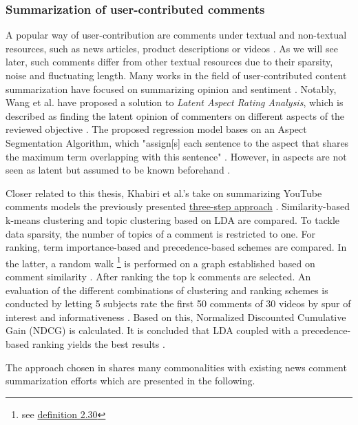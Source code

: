 \subsubsection{Summarization of user-contributed comments}
A popular way of user-contribution are comments under textual and non-textual resources, such as news articles, product descriptions or videos \cite{DBLP:conf/cikm/MaSYC12}. As we will see later, such comments differ from other textual resources due to their sparsity, noise and fluctuating length.
Many works in the field of user-contributed content summarization have focused on summarizing opinion and sentiment \cite{DBLP:conf/cikm/MaSYC12}.
Notably, Wang et al. \cite{Wang:2010:LAR:1835804.1835903} have proposed a solution to \textit{Latent Aspect Rating Analysis}, which is described as finding the latent opinion of commenters on different aspects of the reviewed objective \cite{Wang:2010:LAR:1835804.1835903}. The proposed regression model bases on an Aspect Segmentation Algorithm, which "assign[s] each sentence to the aspect that shares the maximum term overlapping with this sentence" \cite{Wang:2010:LAR:1835804.1835903}. However, in \cite{Wang:2010:LAR:1835804.1835903} aspects are not seen as latent but assumed to be known beforehand \cite{Wang:2010:LAR:1835804.1835903}.\par
Closer related to this thesis, Khabiri et al.'s \cite{DBLP:conf/icwsm/KhabiriCH11} take on summarizing YouTube comments models the previously presented \hyperref[threestep]{three-step approach} \cite{DBLP:books/sp/mining2012/NenkovaM12}.
Similarity-based k-means clustering and topic clustering based on LDA are compared. To tackle data sparsity, the number of topics of a comment is restricted to one. For ranking, term importance-based and precedence-based schemes are compared. In the latter, a random walk \footnote{see \hyperref[sprocess]{definition 2.30}} is performed on a graph established based on comment similarity \cite{DBLP:conf/icwsm/KhabiriCH11}. After ranking the top k comments are selected. An evaluation of the different combinations of clustering and ranking schemes is conducted by letting 5 subjects rate the first 50 comments of 30 videos by spur of interest and informativeness \cite{DBLP:conf/icwsm/KhabiriCH11}. Based on this, Normalized Discounted Cumulative Gain (NDCG) is calculated. It is concluded that LDA coupled with a precedence-based ranking yields the best results \cite{DBLP:conf/icwsm/KhabiriCH11}. \par
The approach chosen in \cite{DBLP:conf/icwsm/KhabiriCH11} shares many commonalities with existing news comment summarization efforts \cite{DBLP:conf/cikm/MaSYC12, llewellyn_grover_oberlander} which are presented in the following.

